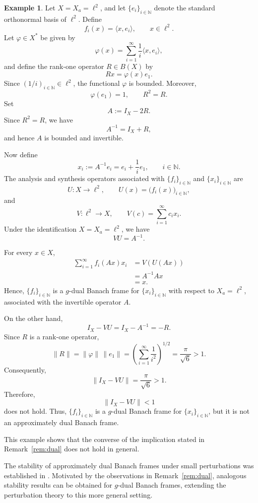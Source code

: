 \documentclass[12pt]{article}
\theoremstyle{definition}
\newtheorem{example}[theorem]{Example}
\theoremstyle{remark}
\begin{document}
\begin{example}
	Let \(X=X_a=\ell^2\), and let
	\(\{e_i\}_{i\in\mathbb{N}}\) denote the standard orthonormal basis of
	\(\ell^2\). Define
	\[
	f_i(x)=\langle x,e_i\rangle,
	\qquad x\in\ell^2.
	\]
	Let \(\varphi\in X^*\) be given by
	\[
	\varphi(x)=\sum_{i=1}^{\infty}\frac{1}{i}\langle x,e_i\rangle,
	\]
	and define the rank-one operator \(R\in B(X)\) by
	\[
	Rx=\varphi(x)e_1.
	\]
	Since \((1/i)_{i\in\mathbb{N}}\in\ell^2\), the functional
	\(\varphi\) is bounded. Moreover,
	\[
	\varphi(e_1)=1,
	\qquad
	R^2=R.
	\]
	Set
	\[
	A:=I_X-2R.
	\]
	Since \(R^2=R\), we have
	\[
	A^{-1}=I_X+R,
	\]
	and hence \(A\) is bounded and invertible.
	
	Now define
	\[
	x_i:=A^{-1}e_i
	=e_i+\frac{1}{i}e_1,
	\qquad i\in\mathbb{N}.
	\]
	The analysis and synthesis operators associated with
	\(\{f_i\}_{i\in\mathbb{N}}\) and \(\{x_i\}_{i\in\mathbb{N}}\) are
	\[
	U:X\to\ell^2,
	\qquad
	U(x)=\bigl(f_i(x)\bigr)_{i\in\mathbb{N}},
	\]
	and
	\[
	V:\ell^2\to X,
	\qquad
	V(c)=\sum_{i=1}^{\infty}c_i x_i.
	\]
	Under the identification \(X=X_a=\ell^2\), we have
	\[
	VU=A^{-1}.
	\]
	
	For every \(x\in X\),
	\[
	\begin{aligned}
		\sum_{i=1}^{\infty}f_i(Ax)x_i
		&=V(U(Ax))\\
		&=A^{-1}Ax\\
		&=x.
	\end{aligned}
	\]
	Hence, \(\{f_i\}_{i\in\mathbb{N}}\) is a \(g\)-dual Banach frame for
	\(\{x_i\}_{i\in\mathbb{N}}\) with respect to \(X_a=\ell^2\), associated
	with the invertible operator \(A\).
	
	On the other hand,
	\[
	I_X-VU
	=
	I_X-A^{-1}
	=
	-R.
	\]
	Since \(R\) is a rank-one operator,
	\[
	\|R\|
	=
	\|\varphi\|\,\|e_1\|
	=
	\left(\sum_{i=1}^{\infty}\frac{1}{i^2}\right)^{1/2}
	=
	\frac{\pi}{\sqrt{6}}>1.
	\]
	Consequently,
	\[
	\|I_X-VU\|
	=
	\frac{\pi}{\sqrt{6}}>1.
	\]
	Therefore,
	\[
	\|I_X-VU\|<1
	\]
	does not hold. Thus, \(\{f_i\}_{i\in\mathbb{N}}\) is a
	\(g\)-dual Banach frame for \(\{x_i\}_{i\in\mathbb{N}}\), but it is not
	an approximately dual Banach frame.
	
	This example shows that the converse of the implication stated in
	Remark~\ref{rem:dual} does not hold in general.
\end{example}

The stability of approximately dual Banach frames under small
perturbations was established in \cite{Karimizad2014}. Motivated by
the observations in Remark~\ref{rem:dual}, analogous stability results can be
obtained for \(g\)-dual Banach frames, extending the perturbation
theory to this more general setting.
\end{document}
